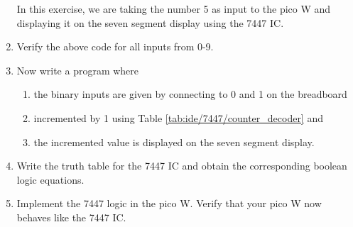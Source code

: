 \begin{enumerate}[label=\arabic*.,ref=\theenumi]
\solution
In this exercise, we are taking the number 5 as input to the pico W and displaying it on the seven segment display using the 7447 IC.
\begin{table}[H]
\centering

\caption{}
\label{table:ip_7447_ard}
\end{table}
\item
Verify the above code for all inputs from 0-9.

\item
Now write a program where 
\begin{enumerate}
\item the binary inputs are given by
connecting to 0 and 1 on the breadboard
\item incremented by 1 using Table \ref{tab:ide/7447/counter_decoder} and
\item the incremented value is displayed on the seven segment display.
\end{enumerate}

\item
Write the truth table for the 7447 IC and obtain the corresponding boolean logic equations. 

\item
Implement the 7447 logic in the pico W.  Verify that your pico W now behaves like the 7447 IC.
	\end{enumerate}
